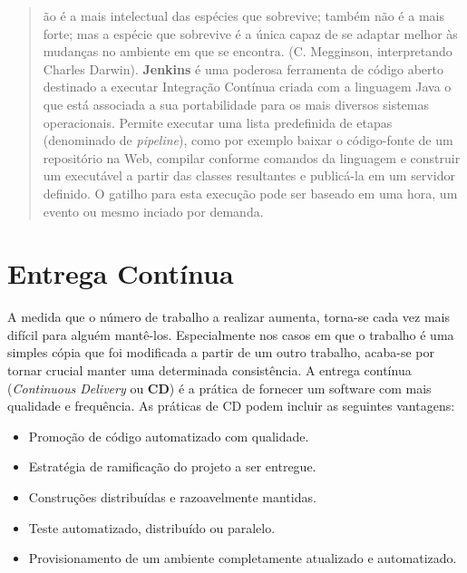 \documentclass[a4paper,11pt]{article}
\begin{document}
	
\maketitle %
\thispagestyle{fancy} %


\begin{abstract}	
	ão é a mais intelectual das espécies que sobrevive; também não é a mais forte; mas a espécie que sobrevive é a única capaz de se adaptar melhor às mudanças no ambiente em que se encontra. (C. Megginson, interpretando Charles Darwin). \textbf{Jenkins} é uma poderosa ferramenta de código aberto destinado a executar Integração Contínua criada com a linguagem Java o que está associada a sua portabilidade para os mais diversos sistemas operacionais. Permite executar uma lista predefinida de etapas (denominado de \textit{pipeline}), como por exemplo baixar o código-fonte de um repositório na Web, compilar conforme comandos da linguagem e construir um executável a partir das classes resultantes e publicá-la em um servidor definido. O gatilho para esta execução pode ser baseado em uma hora, um evento ou mesmo inciado por demanda.
\end{abstract}

\section{Entrega Contínua}
A medida que o número de trabalho a realizar aumenta, torna-se cada vez mais difícil para alguém mantê-los. Especialmente nos casos em que o trabalho é uma simples cópia que foi modificada a partir de um outro trabalho, acaba-se por tornar crucial manter uma determinada consistência. A entrega contínua (\textit{Continuous Delivery} ou \textbf{CD}) é a prática de fornecer um software com mais qualidade e frequência. As práticas de CD podem incluir as seguintes vantagens:
\begin{itemize}
	\item Promoção de código automatizado com qualidade.
	\item Estratégia de ramificação do projeto a ser entregue.
	\item Construções distribuídas e razoavelmente mantidas.
	\item Teste automatizado, distribuído ou paralelo.
	\item Provisionamento de um ambiente completamente atualizado e automatizado.
\end{itemize}
\end{document}

